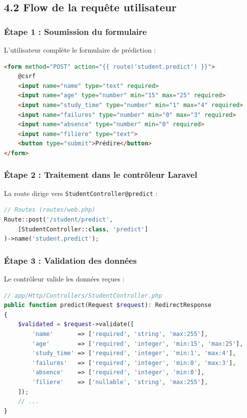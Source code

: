 \documentclass[12pt,a4paper]{article}
\begin{document}
\subsection{4.2 Flow de la requête utilisateur}

\subsubsection{Étape 1 : Soumission du formulaire}

L'utilisateur complète le formulaire de prédiction :

\begin{lstlisting}[language=html]
<form method="POST" action="{{ route('student.predict') }}">
    @csrf
    <input name="name" type="text" required>
    <input name="age" type="number" min="15" max="25" required>
    <input name="study_time" type="number" min="1" max="4" required>
    <input name="failures" type="number" min="0" max="3" required>
    <input name="absence" type="number" min="0" required>
    <input name="filiere" type="text">
    <button type="submit">Prédire</button>
</form>
\end{lstlisting}

\subsubsection{Étape 2 : Traitement dans le contrôleur Laravel}

La route dirige vers \texttt{StudentController@predict} :

\begin{lstlisting}[language=php]
// Routes (routes/web.php)
Route::post('/student/predict', 
    [StudentController::class, 'predict']
)->name('student.predict');
\end{lstlisting}

\subsubsection{Étape 3 : Validation des données}

Le contrôleur valide les données reçues :

\begin{lstlisting}[language=php]
// app/Http/Controllers/StudentController.php
public function predict(Request $request): RedirectResponse
{
    $validated = $request->validate([
        'name'       => ['required', 'string', 'max:255'],
        'age'        => ['required', 'integer', 'min:15', 'max:25'],
        'study_time' => ['required', 'integer', 'min:1', 'max:4'],
        'failures'   => ['required', 'integer', 'min:0', 'max:3'],
        'absence'    => ['required', 'integer', 'min:0'],
        'filiere'    => ['nullable', 'string', 'max:255'],
    ]);
    // ...
}
\end{lstlisting}
\end{document}

